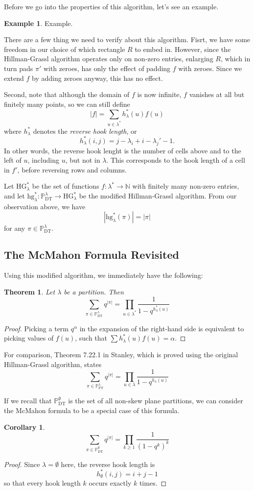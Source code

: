 \documentclass{amsart}
\newcommand{\pt}[1]{\mathbb{P}_\mathrm{PT}^{#1}}
\newcommand{\dt}[1]{\mathbb{P}_\mathrm{DT}^{#1}}
\newcommand{\NN}{\mathbb{N}}
\newcommand{\HG}[1]{\mathrm{HG}_{#1}}
\newcommand{\hg}[1]{\mathrm{hg}_{#1}}
\newtheorem{theorem}{Theorem}
\newtheorem{corollary}{Corollary}
\theoremstyle{definition}
\newtheorem{example}{Example}
\begin{document}
Before we go into the properties of this algorithm, let's see an
example.
\begin{example}
  Example.
\end{example}

There are a few thing we need to verify about this algorithm.  Fisrt,
we have some freedom in our choice of which rectangle $R$ to embed
in.  However, since the Hillman-Grassl algorithm operates only on
non-zero entries, enlarging $R$, which in turn pads $\pi'$ with
zeroes, has only the effect of padding $f$ with zeroes.  Since we
extend $f$ by adding zeroes anyway, this has no effect.

Second, note that although the domain of $f$ is now infinite, $f$
vanishes at all but finitely many points, so we can still define
\[ |f| = \sum_{u \in \lambda^*} h_\lambda^*(u) f(u) \]
where $h_\lambda^*$ denotes the \emph{reverse hook length}, or
\[ h_\lambda^*(i, j) = j - \lambda_i + i - \lambda_j' - 1. \]
In other words, the reverse hook lenght is the number of cells above
and to the left of $u$, including $u$, but not in $\lambda$.  This
corresponds to the hook length of a cell in $f'$, before reversing
rows and columns.

Let $\HG{\lambda}^*$ be the set of functions $f : \lambda^* \to
\NN$ with finitely many non-zero entries, and let $\hg{\lambda}^* :
\dt{\lambda} \to \HG{\lambda}^*$ be the modified Hillman-Grassl
algorithm.  From our observation above, we have
\[
  |\hg{\lambda}^*(\pi)| = |\pi|
\]
for any $\pi \in \dt{\lambda}$.

\subsection{The McMahon Formula Revisited}
Using this modified algorithm, we immediately have the following:
\begin{theorem}
  Let $\lambda$ be a partition.  Then
  \[
    \sum_{\pi \in \dt{\lambda}} q^{|\pi|} =
    \prod_{u \in \lambda^*} \frac{1}{1 - q^{h_\lambda^*(u)}}
  \]
\end{theorem}
\begin{proof}
  Picking a term $q^\alpha$ in the expansion of the right-hand side is
  equivalent to picking values of $f(u)$, such that $\sum
  h_\lambda^*(u)f(u) = \alpha$.
\end{proof}

For comparison, Theorem 7.22.1 in Stanley, which is proved using the
original Hillman-Grassl algorithm, states
\[
  \sum_{\pi \in \pt{\lambda}} q^{|\pi|} =
  \prod_{u \in \lambda} \frac{1}{1 - q^{h_\lambda(u)}}
\]

If we recall that $\dt{\emptyset}$ is the set of all non-skew plane
partitions, we can consider the McMahon formula to be a special case
of this formula.
\begin{corollary}
\[
  \sum_{\pi \in \dt{\emptyset}} q^{|\pi|} =
  \prod_{k \geq 1} \frac{1}{\left(1 - q^k\right)^k}
\]
\end{corollary}
\begin{proof}
  Since $\lambda = \emptyset$ here, the reverse hook length is
  \[
    h_\emptyset^*(i, j) = i + j - 1
  \]
  so that every hook length $k$ occurs exactly $k$ times.
\end{proof}
\end{document}
